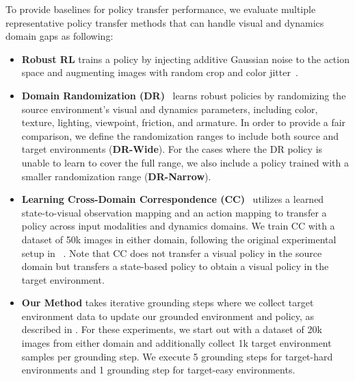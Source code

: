 To provide baselines for policy transfer performance, we evaluate multiple representative policy transfer methods that can handle visual and dynamics domain gaps as following:
\begin{itemize}
    \item \textbf{Robust RL} trains a policy by injecting additive Gaussian noise to the action space and augmenting images with random crop and color jitter~\citep{laskin2020reinforcement}. %

    \item \textbf{Domain Randomization (DR)}~\citep{tobin2017domain, peng2018sim} learns robust policies by randomizing the source environment's visual and dynamics parameters, including color, texture, lighting, viewpoint, friction, and armature. In order to provide a fair comparison, we define the randomization ranges to include both source and target environments (\textbf{DR-Wide}). For the cases where the DR policy is unable to learn to cover the full range, we also include a policy trained with a smaller randomization range (\textbf{DR-Narrow}). %

    \item \textbf{Learning Cross-Domain Correspondence (CC)}~\citep{zhang2021learning} utilizes a learned state-to-visual observation mapping and an action mapping to transfer a policy across input modalities and dynamics domains. We train CC with a dataset of 50k images in either domain, following the original experimental setup in ~\citet{zhang2021learning}.  Note that CC does not transfer a visual policy in the source domain but transfers a state-based policy to obtain a visual policy in the target environment.
    
    \item \textbf{Our Method} takes iterative grounding steps where we collect target environment data to update our grounded environment and policy, as described in . For these experiments, we start out with a dataset of 20k images from either domain and additionally collect 1k target environment samples per grounding step.  We execute 5 grounding steps for target-hard environments and 1 grounding step for target-easy environments.  
    
\end{itemize}



